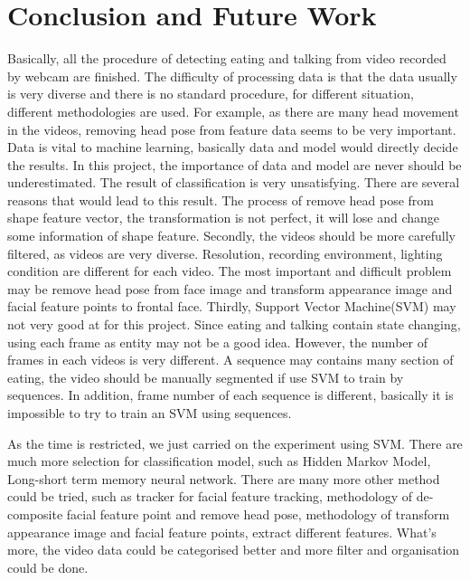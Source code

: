 \chapter{Conclusion and Future Work}
Basically, all the procedure of detecting eating and talking from video recorded by webcam are finished. The difficulty of processing data is that the data usually is very diverse and there is no standard procedure, for different situation, different methodologies are used. For example, as there are many head movement in the videos, removing head pose from feature data seems to be very important. Data is vital to machine learning, basically data and model would directly decide the results. In this project, the importance of data and model are never should be underestimated. The result of classification is very unsatisfying. There are several reasons that would lead to this result. The process of remove head pose from shape feature vector, the transformation is not perfect, it will lose and change some information of shape feature. Secondly, the videos should be more carefully filtered, as videos are very diverse. Resolution, recording environment, lighting condition are different for each video. The most important and difficult problem may be remove head pose from face image and transform appearance image and facial feature points to frontal face. Thirdly, Support Vector Machine(SVM) may not very good at for this project. Since eating and talking contain state changing, using each frame as entity may not be a good idea. However, the number of frames in each videos is very different. A sequence may contains many section of eating, the video should be manually segmented if use SVM to train by sequences. In addition, frame number of each sequence is different, basically it is impossible to try to train an SVM using sequences.

As the time is restricted, we just carried on the experiment using SVM. There are much more selection for classification model, such as Hidden Markov Model, Long-short term memory neural network. There are many more other method could be tried, such as tracker for facial feature tracking, methodology of de-composite facial feature point and remove head pose, methodology of transform appearance image and facial feature points, extract different features. What's more, the video data could be categorised better and more filter and organisation could be done.

